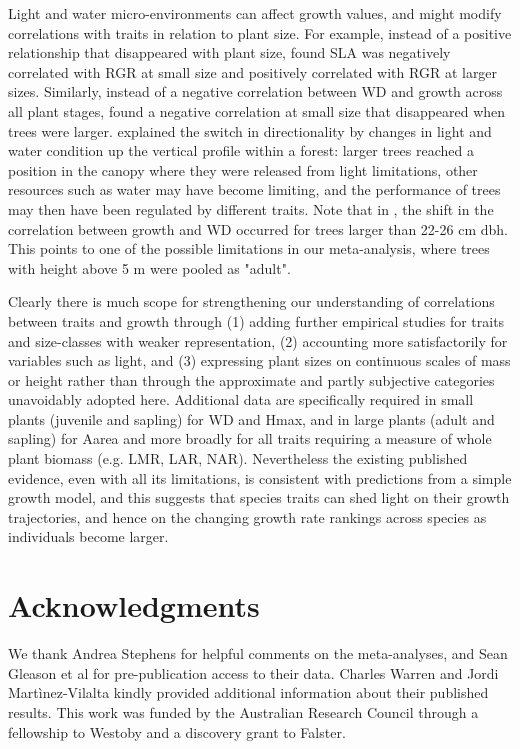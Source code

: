 \documentclass[a4paper]{article}\usepackage[]{graphicx}\usepackage[]{color}
\begin{document}
Light and water micro-environments can affect growth values, and might modify correlations with traits in relation to plant size. For example, instead of a positive relationship that disappeared with plant size, \citet{Iida:2014ep} found SLA was negatively correlated with RGR at small size and positively correlated with RGR at larger sizes. Similarly, instead of a negative correlation between WD and growth across all plant stages, \citep{Iida:2014ep,Iida:2014hq} found a negative correlation at small size that disappeared when trees were larger. \citet{Iida:2014hq} explained the switch in directionality by changes in light and water condition up the vertical profile within a forest: larger trees reached a position in the canopy where they were released from light limitations, other resources such as water may have become limiting, and the performance of trees may then have been regulated by different traits. Note that in \citet{Iida:2014hq}, the shift in the correlation between growth and WD occurred for trees larger than 22-26 cm dbh. This points to one of the possible limitations in our meta-analysis, where trees with height above 5 m were pooled as "adult". 

Clearly there is much scope for strengthening our understanding of correlations between traits and growth through (1) adding further empirical studies for traits and size-classes with weaker representation, (2) accounting more satisfactorily for variables such as light, and (3) expressing plant sizes on continuous scales of mass or height rather than through the approximate and partly subjective categories unavoidably adopted here. Additional data are specifically required in small plants (juvenile and sapling) for WD and Hmax, and in large plants (adult and sapling) for Aarea and more broadly for all traits requiring a measure of whole plant biomass (e.g. LMR, LAR, NAR). Nevertheless the existing published evidence, even with all its limitations, is consistent with predictions from a simple growth model, and this suggests that species traits can shed light on their growth trajectories, and hence on the changing growth rate rankings across species as individuals become larger. 



\section*{Acknowledgments}\label{Acknowledgment}

We thank Andrea Stephens for helpful comments on the meta-analyses, and Sean Gleason et al for pre-publication access to their data. Charles Warren and Jordi Martìnez-Vilalta kindly provided additional information about their published results. This work was funded by the Australian Research Council through a fellowship to Westoby and a discovery grant to Falster.  
\end{document}
